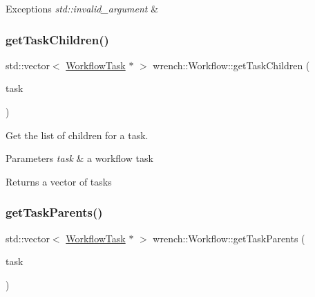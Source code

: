 \begin{DoxyExceptions}{Exceptions}
{\em std\+::invalid\+\_\+argument} & \\
\hline
\end{DoxyExceptions}
\mbox{\label{classwrench_1_1_workflow_a41bac6171a8698b355ffc90f0746d2fd}} 
\subsubsection{\texorpdfstring{get\+Task\+Children()}{getTaskChildren()}}
{\footnotesize\ttfamily std\+::vector$<$ \hyperlink{classwrench_1_1_workflow_task}{Workflow\+Task} $\ast$ $>$ wrench\+::\+Workflow\+::get\+Task\+Children (\begin{DoxyParamCaption}\item[{const \hyperlink{classwrench_1_1_workflow_task}{Workflow\+Task} $\ast$}]{task }\end{DoxyParamCaption})}



Get the list of children for a task. 


\begin{DoxyParams}{Parameters}
{\em task} & a workflow task\\
\hline
\end{DoxyParams}
\begin{DoxyReturn}{Returns}
a vector of tasks 
\end{DoxyReturn}
\mbox{\label{classwrench_1_1_workflow_af1e29741cd98e691cd2aba0038453176}} 
\subsubsection{\texorpdfstring{get\+Task\+Parents()}{getTaskParents()}}
{\footnotesize\ttfamily std\+::vector$<$ \hyperlink{classwrench_1_1_workflow_task}{Workflow\+Task} $\ast$ $>$ wrench\+::\+Workflow\+::get\+Task\+Parents (\begin{DoxyParamCaption}\item[{const \hyperlink{classwrench_1_1_workflow_task}{Workflow\+Task} $\ast$}]{task }\end{DoxyParamCaption})}



